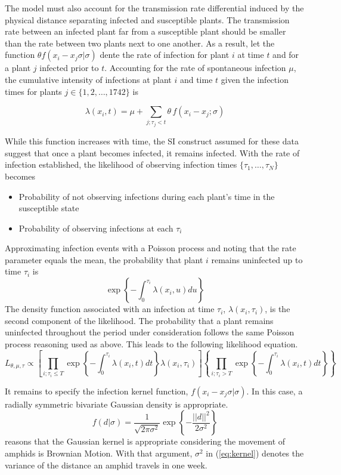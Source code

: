 \documentclass{uwstat572}
\begin{document}
The model must also account for the transmission rate differential induced by the physical distance separating infected and susceptible plants. 
The transmission rate between an infected plant far from a susceptible plant should be smaller than the rate between two plants next to one another.
As a result, let the function $\theta f(x_i -x_j \sigma | \sigma)$ dente the rate of infection for plant $i$ at time $t$ and for a plant $j$ infected prior to $t$. 
Accounting for the rate of spontaneous infection $\mu$, the cumulative intensity of infections at plant $i$ and time $t$ given the infection times for plants $j \in \{1, 2, \dots, 1742\}$ is 

$$ \lambda(x_i,t) = \mu + \sum_{j; \tau_j<t} \theta \, f(x_i - x_j; \sigma)$$

While this function increases with time, the SI construct assumed for these data suggest that once a plant becomes infected, it remains infected. 
With the rate of infection established, the likelihood of observing infection times $\{\tau_1, \dots, \tau_N\}$ becomes
\begin{itemize}
\item Probability of not observing infections during each plant's time in the susceptible state 
\item Probability of observing infections at each $\tau_i$
\end{itemize}
Approximating infection events with a Poisson process and noting that the rate parameter equals the mean, the probability that plant $i$ remains uninfected up to time $\tau_i$ is 
$$ \exp \left\{- \int^{\tau_i}_{0} \lambda(x_i, u) du \right\}$$
The density function associated with an infection at time $\tau_i$, $\lambda(x_i, \tau_i)$, is the second component of the likelihood. 
The probability that a plant remains uninfected throughout the period under consideration follows the same Poisson process reasoning used as above. 
This leads to the following likelihood equation. 
\begin{equation} L_{\theta, \mu, \tau} \propto \left[ \prod_{i;\tau_i \le T} \exp \left\{-\int^{\tau_i}_0 \lambda(x_i, t)dt\right \} \lambda(x_i, \tau_i)\right] \left\{ \prod_{i;\tau_i > T} \exp \left\{-\int^{\tau_i}_0 \lambda(x_i, t)dt\right \}\right\} \end{equation}

It remains to specify the infection kernel function, $f(x_i -x_j \sigma | \sigma)$. In this case, a radially symmetric bivariate Gaussian density is appropriate. 
\begin{equation} f(d|\sigma) = \frac{1}{\sqrt{2\pi \sigma^2}} \exp \left\{-\frac{||d||^2}{2\sigma^2} \right\} \label{eq:kernel} \end{equation}
\cite{Brown} reasons that the Gaussian kernel is appropriate considering the movement of amphids is Brownian Motion. 
With that argument, $\sigma^2$ in (\ref{eq:kernel}) denotes the variance of the distance an amphid travels in one week. 
\end{document}
